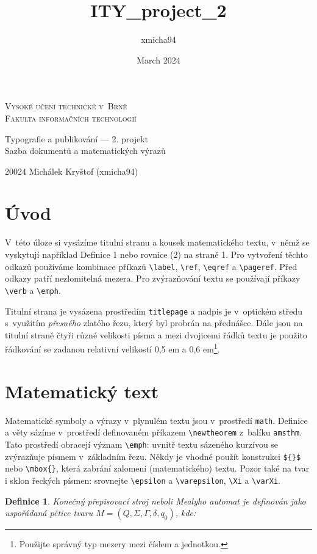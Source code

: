\documentclass[a4paper, twocolumn, 11pt]{article}
\title{ITY_project_2}
\author{xmicha94}
\date{March 2024}
\newtheorem{theorem}{Definice}
\begin{document}
\thispagestyle{empty}
\onecolumn
\begin{center}
\Huge 
\textsc{{\Huge Vysoké učení technické v~Brně \\[0.5em]}}
\textsc{{\huge Fakulta informačních technologií}}
\vfill

{\LARGE Typografie a publikování –– 2. projekt \\[0.6em]
Sazba dokumentů a matematických výrazů}
\vfill
\end{center}

{\LARGE 20024 \hfill Michálek Kryštof (xmicha94)}

\newpage
\twocolumn
\section*{Úvod}
V~této úloze si vysázíme titulní stranu a kousek matematického textu, v~němž se vyskytují například Definice 1 nebo rovnice (2) na straně 1. Pro vytvoření těchto odkazů používáme kombinace příkazů \verb|\label|,
\verb|\ref|, \verb|\eqref| a \verb|\pageref|. Před odkazy patří nezlomitelná mezera. Pro zvýrazňování textu se používají
příkazy \verb|\verb| a \verb|\emph|.

Titulní strana je vysázena prostředím \texttt{titlepage}
a nadpis je v~optickém středu s~využitím \textit{přesného} zlatého řezu, který byl probrán na přednášce. Dále jsou
na titulní straně čtyři různé velikosti písma a mezi
dvojicemi řádků textu je použito řádkování se zadanou relativní velikostí 0,5 em a 0,6 em\footnote{Použijte správný typ mezery mezi číslem a jednotkou.}.

\section{Matematický text}
Matematické symboly a výrazy v~plynulém textu jsou
v~prostředí \texttt{math}. Definice a věty sázíme v~prostředí
definovaném příkazem \verb|\newtheorem| z~balíku \texttt{amsthm}.
Tato prostředí obracejí význam \verb|\emph|: uvnitř textu
sázeného kurzívou se zvýrazňuje písmem v~základním řezu. Někdy je vhodné použít konstrukci \verb|${}$|
nebo \verb|\mbox{}|, která zabrání zalomení (matematického) textu. Pozor také na tvar i sklon řeckých písmen:
srovnejte \verb|\epsilon| a \verb|\varepsilon|, \verb|\Xi| a \verb|\varXi|.
\begin{theorem}
\emph{Konečný přepisovací stroj} neboli \emph{Mea\-ly\-ho automat} je definován jako uspořádaná pětice
tvaru $M = (Q, \mathit\Sigma, \mathit\Gamma, \delta, q_0)$, kde:
\end{theorem}
\end{document}
